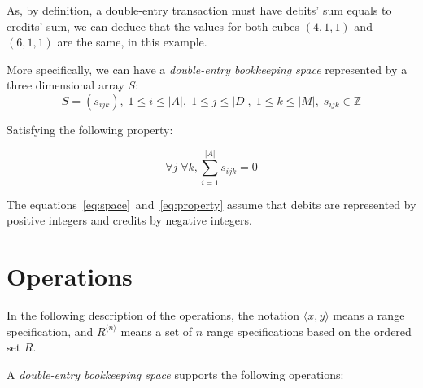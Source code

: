 \documentclass{article}
\begin{document}
As, by definition, a double-entry transaction must have debits' sum
equals to credits' sum, we can deduce that the values for both
cubes $(4,1,1)$ and $(6,1,1)$ are the same, in this example.

More specifically, we can have a \emph{double-entry bookkeeping space} 
represented by a three dimensional array $S$:
\begin{equation}
	\label{eq:space}
	S = \left(s_{ijk}\right), 
	\; 1 \leq i \leq |A|, \; 1 \leq j \leq |D|, \; 1 \leq k \leq |M|, 
	\; s_{ijk} \in \mathbb{Z}
\end{equation}

Satisfying the following property:

\begin{equation}
	\label{eq:property}
	\forall j \; \forall k, \sum_{i=1}^{|A|}{s_{ijk}} = 0
\end{equation}

The equations~\eqref{eq:space}~and~\eqref{eq:property}
assume that debits are represented by positive integers
and credits by negative integers.

\section{Operations}

In the following description of the operations, the notation $\langle x, y \rangle$ means
a range specification, and $R^{\langle n \rangle}$ means a set of $n$
range specifications based on the ordered set $R$.

A \emph{double-entry bookkeeping space} supports the following operations:
\end{document}
